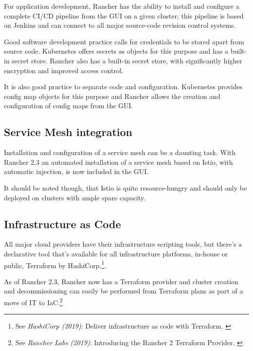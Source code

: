 For application development, Rancher has the ability to install and configure a complete CI/CD pipeline from the GUI on a given cluster; this pipeline is based on Jenkins and can connect to all major source-code revision control systems.

Good software development practice calls for credentials to be stored apart from source code. Kubernetes offers secrets as objects for this purpose and has a built-in secret store. Rancher also has a built-in secret store, with significantly higher encryption and improved access control.

It is also good practice to separate code and configuration. Kubernetes provides config map objects for this purpose and Rancher allows the creation and configuration of config maps from the GUI.

\subsection{Service Mesh integration}

Installation and configuration of a service mesh can be a daunting task. With Rancher 2.3 an automated installation of a service mesh based on Istio, with automatic injection, is now included in the GUI.

It should be noted though, that Istio is quite resource-hungry and should only be deployed on clusters with ample spare capacity.

\subsection{Infrastructure as Code}

All major cloud providers have their infrastructure scripting tools, but there's a declarative tool that's available for all infrastructure platforms, in-house or public, Terraform by HashiCorp.\footnote{See \textit{HashiCorp (2019)}: Deliver infrastructure as code with Terraform. \cite{terraform}}.

As of Rancher 2.3, Rancher now has a Terraform provider and cluster creation and decommissioning can easily be performed from Terraform plans as part of a move of IT to IaC.\footnote{See \textit{Rancher Labs (2019)}: Introducing the Rancher 2 Terraform Provider. \cite{terraformProvider}}
